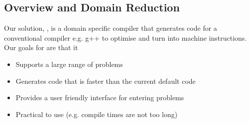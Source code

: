 \newcommand{\vecc}[1]{\vec{\mathbf{#1}}}

\subsection{Overview and Domain Reduction}
Our solution, \phlat, is a domain specific compiler that generates code for a conventional compiler e.g. g++ to optimise and turn into machine instructions.
Our goals for \phlat are that it
\begin{itemize}
    \item Supports a large range of problems
    \item Generates code that is faster than the current default code
    \item Provides a user friendly interface for entering problems
    \item Practical to use (e.g. compile times are not too long)
\end{itemize}

